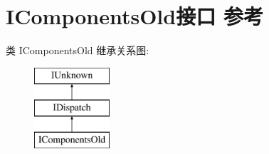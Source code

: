 \hypertarget{interface_i_components_old}{}\section{I\+Components\+Old接口 参考}
\label{interface_i_components_old}
类 I\+Components\+Old 继承关系图\+:\begin{figure}[H]
\begin{center}
\leavevmode
\includegraphics[height=3.000000cm]{interface_i_components_old}
\end{center}
\end{figure}

